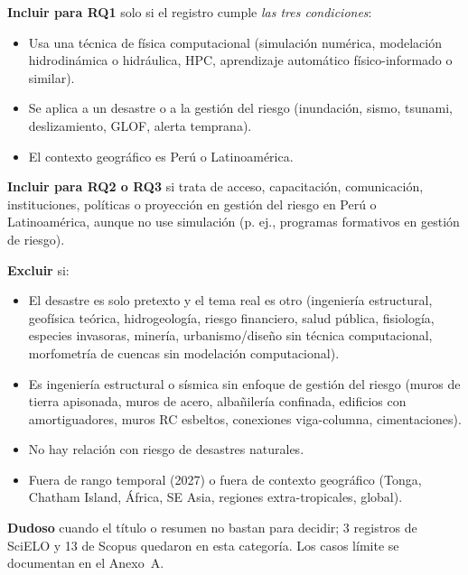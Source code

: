 \documentclass[12pt,a4paper]{article}
\begin{document}
\textbf{Incluir para RQ1} solo si el registro cumple \textit{las tres condiciones}:
\begin{itemize}
  \item Usa una técnica de física computacional (simulación numérica, modelación hidrodinámica o hidráulica, HPC, aprendizaje automático físico-informado o similar).
  \item Se aplica a un desastre o a la gestión del riesgo (inundación, sismo, tsunami, deslizamiento, GLOF, alerta temprana).
  \item El contexto geográfico es Perú o Latinoamérica.
\end{itemize}

\textbf{Incluir para RQ2 o RQ3} si trata de acceso, capacitación, comunicación, instituciones, políticas o proyección en gestión del riesgo en Perú o Latinoamérica, aunque no use simulación (p. ej., programas formativos en gestión de riesgo).

\textbf{Excluir} si:
\begin{itemize}
  \item El desastre es solo pretexto y el tema real es otro (ingeniería estructural, geofísica teórica, hidrogeología, riesgo financiero, salud pública, fisiología, especies invasoras, minería, urbanismo/diseño sin técnica computacional, morfometría de cuencas sin modelación computacional).
  \item Es ingeniería estructural o sísmica sin enfoque de gestión del riesgo (muros de tierra apisonada, muros de acero, albañilería confinada, edificios con amortiguadores, muros RC esbeltos, conexiones viga-columna, cimentaciones).
  \item No hay relación con riesgo de desastres naturales.
  \item Fuera de rango temporal (2027) o fuera de contexto geográfico (Tonga, Chatham Island, África, SE Asia, regiones extra-tropicales, global).
\end{itemize}

\textbf{Dudoso} cuando el título o resumen no bastan para decidir; 3 registros de SciELO y 13 de Scopus quedaron en esta categoría. Los casos límite se documentan en el Anexo~A.
\end{document}
